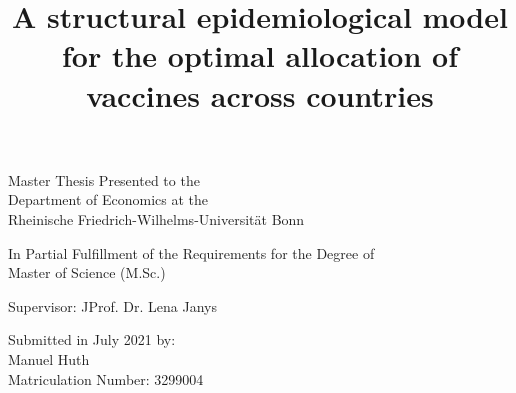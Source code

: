 
\title{A structural epidemiological model for the optimal allocation of vaccines across countries}
\date{}

\maketitle








\begin{center}
\normalsize Master Thesis Presented to the \\
\vspace{0.3cm}
Department of Economics at the\\
\vspace{0.3cm}
Rheinische Friedrich-Wilhelms-Universit{\"a}t Bonn\\
\end{center}
\vspace{0.6cm}
\begin{center}
In Partial Fulfillment of the Requirements for the Degree of \\
Master of Science (M.Sc.)
\end{center}
\vspace{3.5cm}
\begin{center}
Supervisor: JProf. Dr. Lena Janys
\end{center}
\vspace{0.6cm}
\begin{center}
Submitted in July 2021 by: \\
Manuel Huth \\
Matriculation Number: 3299004
\end{center}



\thispagestyle{empty}

\clearpage
